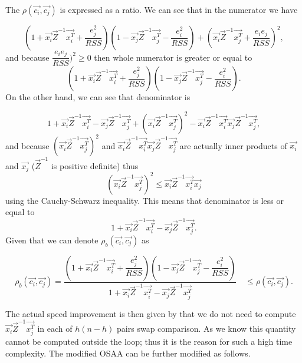 The $\rho(\vec{c_i}, \vec{c_j})$ is expressed as a ratio. We can see that in the numerator we have

\begin{equation}
    (1+\vec{x_i}\vec{Z}^{-1}\vec{x_i^T} + \dfrac{e_j^2}{RSS})
        (1 - \vec{x_j}\vec{Z}^{-1}\vec{x_j^T} - \dfrac{e_i^2}{RSS} )+
        (\vec{x_i}\vec{Z}^{-1}\vec{x_j^T} + \dfrac{e_i e_j}{RSS} )^2,
\end{equation}
and because $ \dfrac{e_i e_j}{RSS} )^2 \geq 0$ then whole numerator is greater or equal to
\begin{equation}
    (1+\vec{x_i}\vec{Z}^{-1}\vec{x_i^T} + \dfrac{e_j^2}{RSS})
(1 - \vec{x_j}\vec{Z}^{-1}\vec{x_j^T} - \dfrac{e_i^2}{RSS} ).
\end{equation}
On the other hand, we can see that denominator is

\begin{equation}
    1 + \vec{x_i}\vec{Z}^{-1}\vec{x_i^T}  - \vec{x_j}\vec{Z}^{-1}\vec{x_j^T}  + (\vec{x_i}\vec{Z}^{-1}\vec{x_j^T})^2 -   \vec{x_i}\vec{Z}^{-1}\vec{x_i^T}\vec{x_j}\vec{Z}^{-1}\vec{x_j^T}, 
\end{equation}
and because $(\vec{x_i}\vec{Z}^{-1}\vec{x_j^T})^2$ and $\vec{x_i}\vec{Z}^{-1}\vec{x_i^T}\vec{x_j}\vec{Z}^{-1}\vec{x_j^T} $ are actually inner products of $\vec{x_i}$ and $\vec{x_j}$  ($\vec{Z}^{-1}$ is positive definite) thus
\begin{equation}
    (\vec{x_i}\vec{Z}^{-1}\vec{x_j^T})^2 \leq \vec{x_i}\vec{Z}^{-1}\vec{x_i^T}\vec{x_j}
\end{equation}
using the Cauchy-Schwarz inequality. This means that denominator is less or equal to
\begin{equation}
    1 + \vec{x_i}\vec{Z}^{-1}\vec{x_i^T}  - \vec{x_j}\vec{Z}^{-1}\vec{x_j^T}.
\end{equation}
Given that we can denote $\rho_b(\vec{c_i}, \vec{c_j})$  as

\begin{equation} \label{boundingcondition}
\rho_b(\vec{c_i}, \vec{c_j}) = \dfrac{(1+\vec{x_i}\vec{Z}^{-1}\vec{x_i^T} + \dfrac{e_j^2}{RSS})
    (1 - \vec{x_j}\vec{Z}^{-1}\vec{x_j^T} - \dfrac{e_i^2}{RSS} )}{1 + \vec{x_i}\vec{Z}^{-1}\vec{x_i^T}  - \vec{x_j}\vec{Z}^{-1}\vec{x_j^T}} \quad \leq \rho(\vec{c_i}, \vec{c_j}).
\end{equation}

The actual speed improvement is then given by that we do not need to compute $\vec{x_i}\vec{Z}^{-1}\vec{x_j^T}$ in each of $h(n-h)$ pairs swap comparison. As we know this quantity cannot be computed outside the loop; thus it is the reason for such a high time complexity. The modified OSAA can be further modified as follows.


